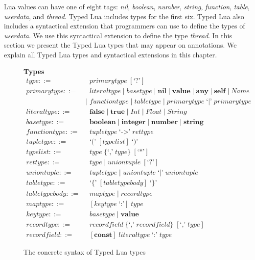 Lua values can have one of eight tags:
\emph{nil}, \emph{boolean}, \emph{number}, \emph{string},
\emph{function}, \emph{table}, \emph{userdata}, and \emph{thread}.
Typed Lua includes types for the first six.
Typed Lua also includes a syntactical extension that programmers can use
to define the types of \emph{userdata}.
We use this syntactical extension to define the type \emph{thread}. 
In this section we present the Typed Lua types that may appear on annotations.
We explain all Typed Lua types and syntactical extensions in this chapter.

\begin{figure}[!ht]
\textbf{Types}\\
\dstart
\begin{align*}
\textit{type} ::= & \;\; \textit{primarytype} \; [\texttt{`?'}]\\
\textit{primarytype} ::= & \;\; \textit{literaltype} \; | \;
  \textit{basetype} \; | \;
  \textbf{nil} \; | \;
  \textbf{value} \; | \;
  \textbf{any} \; | \;
  \textbf{self} \; | \;
  \textit{Name}\\
& | \; \textit{functiontype} \; | \;
  \textit{tabletype} \; | \;
  \textit{primarytype} \; \texttt{`|'} \; \textit{primarytype}\\
\textit{literaltype} ::= & \;\; \textbf{false} \; | \;
  \textbf{true} \; | \;
  \textit{Int} \; | \;
  \textit{Float} \; | \;
  \textit{String}\\
\textit{basetype} ::= & \;\; \textbf{boolean} \; | \;
  \textbf{integer} \; | \;
  \textbf{number} \; | \;
  \textbf{string}\\
\textit{functiontype} ::= & \;\; \textit{tupletype} \; \texttt{`->'} \; \textit{rettype}\\
\textit{tupletype} ::= & \;\; \texttt{`('} \; [typelist] \; \texttt{`)'}\\
\textit{typelist} ::= & \;\; \textit{type} \; \{\texttt{`,'} \; \textit{type}\} \; [\texttt{`*'}]\\
\textit{rettype} ::= & \;\; \textit{type} \; | \;
  \textit{uniontuple} \; [\texttt{`?'}]\\
\textit{uniontuple} ::= & \;\; \textit{tupletype} \; | \;
  \textit{uniontuple} \; \texttt{`|'} \; \textit{uniontuple}\\
\textit{tabletype} ::= & \;\; \texttt{`\{'} \; [\textit{tabletypebody}] \; \texttt{`\}'}\\
\textit{tabletypebody} ::= & \;\; \textit{maptype} \; | \;
  \textit{recordtype}\\
\textit{maptype} ::= & \;\; [\textit{keytype} \; \texttt{`:'}] \; \textit{type}\\
\textit{keytype} ::= & \;\; \textit{basetype} \; | \;
  \textbf{value}\\
\textit{recordtype} ::= & \;\; \textit{recordfield} \; \{\texttt{`,'} \; \textit{recordfield}\} \; [\texttt{`,'} \; \textit{type}]\\
\textit{recordfield} ::= & \;\; [\textbf{const}] \; \textit{literaltype} \; \texttt{`:'} \; \textit{type}
\end{align*}
\dend
\caption{The concrete syntax of Typed Lua types}
\label{fig:types}
\end{figure}

